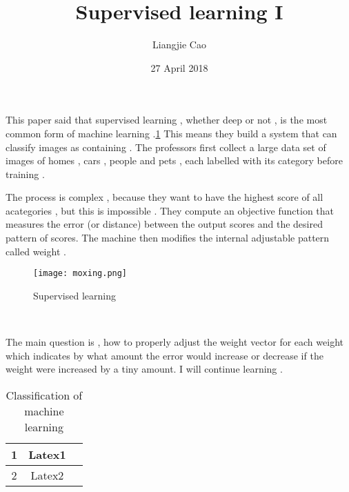 \documentclass[50pt]{article}
\begin{document}
\title{Supervised learning I}
\author{Liangjie Cao}
\date{27 April 2018}
\maketitle
\par
This paper said that supervised learning , whether deep or not , is the most common form of machine learning .\ref{Table} This means they build a system that can classify images as containing . The professors first collect a large data set of images of homes , cars , people and pets , each labelled with its category before training . \\
\par
The process is complex , because they want to have the highest score of all acategories , but this is impossible . They compute an objective function that measures the error (or distance) between the output scores and the desired pattern of scores.\cite{name1} The machine then modifies the internal adjustable pattern called weight .
 \begin{figure}[ht]
 \centering
 \texttt{[image: moxing.png]}\\
 \caption{Supervised learning}
\end{figure}\\
\par
The main question is , how to properly adjust the weight vector for each weight which indicates by what amount the error would increase or decrease if the weight were increased by a tiny amount. I will continue learning . \\
 \begin{table}[!htbp]
  \centering
 \begin{tabular}{|c|c|c|}
  \hline
   1 & Latex1\\
  \hline
    2 & Latex2\\
  \hline
  \end{tabular}
  \caption{Classification of machine learning}\label{Table}
  \end{table}


\end{document}
